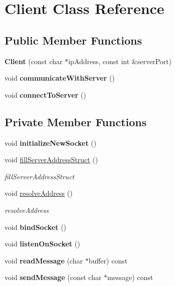 \hypertarget{classClient}{}\section{Client Class Reference}
\label{classClient}
\subsection*{Public Member Functions}
\begin{DoxyCompactItemize}
\item 
\mbox{\label{classClient_a738a9f6805537f970f169c64a9df9ee1}} 
{\bfseries Client} (const char $\ast$ip\+Address, const int \&server\+Port)
\item 
\mbox{\label{classClient_a90c1540d132405d702dbaf23225855e9}} 
void {\bfseries communicate\+With\+Server} ()
\item 
\mbox{\label{classClient_a484b660517d6a610b6733bee7e96cb8c}} 
void {\bfseries connect\+To\+Server} ()
\end{DoxyCompactItemize}
\subsection*{Private Member Functions}
\begin{DoxyCompactItemize}
\item 
\mbox{\label{classClient_af17f9a911bfacf3ddfba5f3263a4c36a}} 
void {\bfseries initialize\+New\+Socket} ()
\item 
void \hyperlink{classClient_a214cdda23175ba7cc4f94037730cbfd4}{fill\+Server\+Address\+Struct} ()
\begin{DoxyCompactList}\small\item\em fill\+Server\+Address\+Struct \end{DoxyCompactList}\item 
void \hyperlink{classClient_a68e3bdb6ca10ee50268f219d58b6a3e3}{resolve\+Address} ()
\begin{DoxyCompactList}\small\item\em resolve\+Address \end{DoxyCompactList}\item 
\mbox{\label{classClient_aa9bed21a29c607963ebb0f1701a38128}} 
void {\bfseries bind\+Socket} ()
\item 
\mbox{\label{classClient_a288e15b64d5c25488e53dd34ba2315f2}} 
void {\bfseries listen\+On\+Socket} ()
\item 
\mbox{\label{classClient_aef8421b20a32263125e44387405b7aef}} 
void {\bfseries read\+Message} (char $\ast$buffer) const
\item 
\mbox{\label{classClient_a02c78116ceed8391aaeb15a6f1d1026f}} 
void {\bfseries send\+Message} (const char $\ast$message) const
\end{DoxyCompactItemize}
